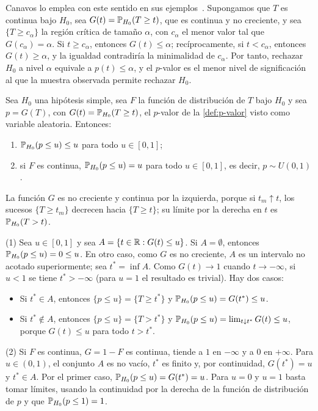 Canavos lo emplea con este sentido en sus ejemplos~\cite[pp.~330 y~580]{canavos2003}. Supongamos que $T$ es continua bajo $H_0$, sea $G(t) = \mathbb{P}_{H_0}(T \ge t)$, que es continua y no creciente, y sea $\{T \ge c_\alpha\}$ la región crítica de tamaño $\alpha$, con $c_\alpha$ el menor valor tal que $G(c_\alpha) = \alpha$. Si $t \ge c_\alpha$, entonces $G(t) \le \alpha$; recíprocamente, si $t < c_\alpha$, entonces $G(t) \ge \alpha$, y la igualdad contradiría la minimalidad de $c_\alpha$. Por tanto, rechazar $H_0$ a nivel $\alpha$ equivale a $p(t) \le \alpha$, y el $p$-valor es el menor nivel de significación al que la muestra observada permite rechazar $H_0$.

\begin{proposicion}\label{prop:p-valor-uniforme}
Sea $H_0$ una hipótesis simple, sea $F$ la función de distribución de $T$ bajo $H_0$ y sea $p = G(T)$, con $G(t) = \mathbb{P}_{H_0}(T \ge t)$, el $p$-valor de la \cref{def:p-valor} visto como variable aleatoria. Entonces:
\begin{enumerate}
  \item $\mathbb{P}_{H_0}(p \le u) \le u$ para todo $u \in [0, 1]$;
  \item si $F$ es continua, $\mathbb{P}_{H_0}(p \le u) = u$ para todo $u \in [0,1]$, es decir, $p \sim U(0, 1)$.
\end{enumerate}
\end{proposicion}
\begin{demostracion}
La función $G$ es no creciente y continua por la izquierda, porque si $t_m \uparrow t$, los sucesos $\{T \ge t_m\}$ decrecen hacia $\{T \ge t\}$; su límite por la derecha en $t$ es $\mathbb{P}_{H_0}(T > t)$.

(1) Sea $u \in [0,1]$ y sea $A = \{t \in \mathbb{R} : G(t) \le u\}$. Si $A = \emptyset$, entonces $\mathbb{P}_{H_0}(p \le u) = 0 \le u$. En otro caso, como $G$ es no creciente, $A$ es un intervalo no acotado superiormente; sea $t^* = \inf A$. Como $G(t) \to 1$ cuando $t \to -\infty$, si $u < 1$ se tiene $t^* > -\infty$ (para $u = 1$ el resultado es trivial). Hay dos casos:
\begin{itemize}
  \item Si $t^* \in A$, entonces $\{p \le u\} = \{T \ge t^*\}$ y $\mathbb{P}_{H_0}(p \le u) = G(t^*) \le u$.
  \item Si $t^* \notin A$, entonces $\{p \le u\} = \{T > t^*\}$ y $\mathbb{P}_{H_0}(p \le u) = \lim_{t \downarrow t^*} G(t) \le u$, porque $G(t) \le u$ para todo $t > t^*$.
\end{itemize}

(2) Si $F$ es continua, $G = 1 - F$ es continua, tiende a $1$ en $-\infty$ y a $0$ en $+\infty$. Para $u \in (0, 1)$, el conjunto $A$ es no vacío, $t^*$ es finito y, por continuidad, $G(t^*) = u$ y $t^* \in A$. Por el primer caso, $\mathbb{P}_{H_0}(p \le u) = G(t^*) = u$. Para $u = 0$ y $u = 1$ basta tomar límites, usando la continuidad por la derecha de la función de distribución de $p$ y que $\mathbb{P}_{H_0}(p \le 1) = 1$.
\end{demostracion}

